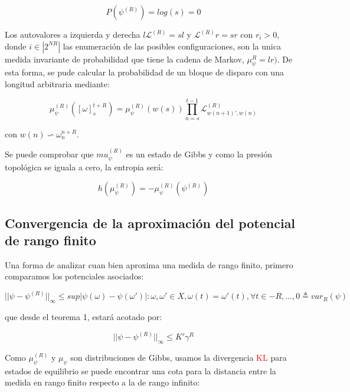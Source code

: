 \begin{equation}
    P(\psi^{(R)})= log(s)=0
\end{equation}

Los autovalores a izquierda y derecha $l\mathcal{L}^{(R)}=sl$ y $\mathcal{L}^{(R)}r=sr$ con $r_i>0$, donde $i\in |2^{NR}|$ las enumeración de las posibles configuraciones, son la unica medida invariante de probabilidad que tiene la cadena de Markov, $\mu_\psi^R = lr)$.
De esta forma, se pude calcular la probabilidad de un bloque de disparo con una longitud arbitraria mediante:

\begin{equation}
    \mu_\psi^{(R)}([\omega]^{t+R}_s)=\mu_\psi^{(R)}(w(s)) \prod_{n=s}^{t-1} \mathcal{L}^{(R)}_{w(n+1)',w(n)}
\end{equation}

con $w(n) \backsim \omega^{n+R}_n $.

Se puede comprobar que $ mu_\psi^{(R)}$ es un estado de Gibbs \cite{keller_equilibrium_1998} y como la presión topológica se iguala a cero, la entropia será:

\begin{equation*}
    h(\mu_\psi^{(R)}) = -\mu_\psi^{(R)}(\psi^{(R)})
\end{equation*}

\subsection{Convergencia de la aproximación del potencial de rango finito}

Una forma de analizar cuan bien aproxima una medida de rango finito, primero comparamos los potenciales asociados:

\begin{equation*}
    || \psi - \psi^{(R)} ||_{\infty} \leq sup{ |\psi(\omega) - \psi(\omega')| : \omega,\omega' \in X, \omega(t)=\omega'(t), \forall t \in {-R,...,0}  } \triangleq var_R(\psi)
\end{equation*}

que desde el teorema 1, estará acotado por:

\begin{equation*}
    || \psi - \psi^{(R)} ||_{\infty} \leq K'\gamma^R
\end{equation*}

Como $\mu_\psi^{(R)}$ y $\mu_\psi$ son distribuciones de Gibbs, usamos la divergencia \textcolor{red}{KL} para estados de equilibrio se puede encontrar una cota para la distancia entre la medida en rango finito respecto a la de rango infinito:

